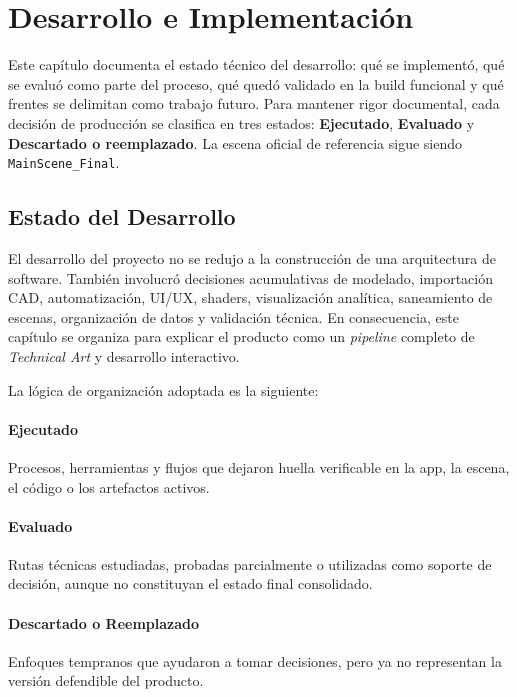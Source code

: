 
\section{Desarrollo e Implementación}

Este capítulo documenta el estado técnico del desarrollo: qué se implementó, qué se evaluó como parte del proceso, qué quedó validado en la build funcional y qué frentes se delimitan como trabajo futuro. Para mantener rigor documental, cada decisión de producción se clasifica en tres estados: \textbf{Ejecutado}, \textbf{Evaluado} y \textbf{Descartado o reemplazado}. La escena oficial de referencia sigue siendo \texttt{MainScene\_Final}.

\subsection{Estado del Desarrollo}

El desarrollo del proyecto no se redujo a la construcción de una arquitectura de software. También involucró decisiones acumulativas de modelado, importación CAD, automatización, UI/UX, shaders, visualización analítica, saneamiento de escenas, organización de datos y validación técnica. En consecuencia, este capítulo se organiza para explicar el producto como un \textit{pipeline} completo de \textit{Technical Art} y desarrollo interactivo.

La lógica de organización adoptada es la siguiente:

\paragraph{Ejecutado} Procesos, herramientas y flujos que dejaron huella verificable en la app, la escena, el código o los artefactos activos.

\paragraph{Evaluado} Rutas técnicas estudiadas, probadas parcialmente o utilizadas como soporte de decisión, aunque no constituyan el estado final consolidado.

\paragraph{Descartado o Reemplazado} Enfoques tempranos que ayudaron a tomar decisiones, pero ya no representan la versión defendible del producto.

